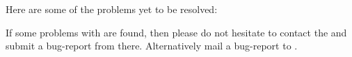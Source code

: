 Here are some of the problems yet to be resolved:

If some problems with \period are found, then please do not
hesitate to contact the 
 and submit a bug-report 
from there. Alternatively mail a bug-report to \periodmail.

